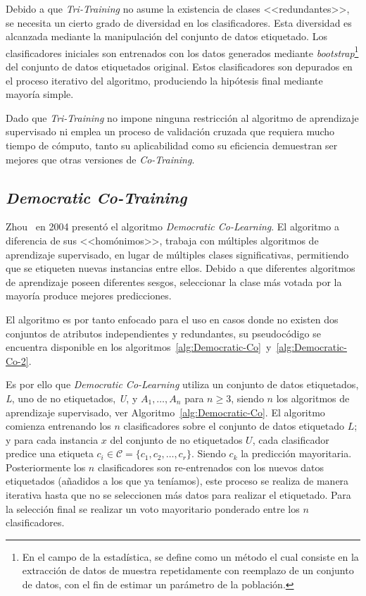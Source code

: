 Debido a que \textit{Tri-Training} no asume la existencia de clases <<redundantes>>, se necesita un cierto grado de diversidad en los clasificadores. Esta diversidad es alcanzada mediante la manipulación del conjunto de datos etiquetado. Los clasificadores iniciales son entrenados con los datos generados mediante \textit{bootstrap}\footnote{En el campo de la estadística, se define como un método el cual consiste en la extracción de datos de muestra repetidamente con reemplazo de un conjunto de datos, con el fin de estimar un parámetro de la población.} del conjunto de datos etiquetados original. Estos clasificadores son depurados en el proceso iterativo del algoritmo, produciendo la hipótesis final mediante mayoría simple.

Dado que \textit{Tri-Training} no impone ninguna restricción al algoritmo de aprendizaje supervisado ni emplea un proceso de validación cruzada que requiera mucho tiempo de cómputo, tanto su aplicabilidad como su eficiencia demuestran ser mejores que otras versiones de \textit{Co-Training}.

\subsection{\textit{Democratic Co-Training}}
Zhou~\cite{zhou2004democratic} en 2004 presentó el algoritmo \textit{Democratic Co-Learning}. El algoritmo a diferencia de sus <<homónimos>>, trabaja con múltiples algoritmos de aprendizaje supervisado, en lugar de múltiples clases significativas, permitiendo que se etiqueten nuevas instancias entre ellos. Debido a que diferentes algoritmos de aprendizaje poseen diferentes sesgos, seleccionar la clase más votada por la mayoría produce mejores predicciones.

El algoritmo es por tanto enfocado para el uso en casos donde no existen dos conjuntos de atributos independientes y redundantes, su pseudocódigo se encuentra disponible en los algoritmos~\ref{alg:Democratic-Co}~y~\ref{alg:Democratic-Co-2}.

Es por ello que \textit{Democratic Co-Learning} utiliza un conjunto de datos etiquetados, \textit{L}, uno de no etiquetados, \textit{U}, y $A_1,\dots ,A_n$ para $n \geq 3$, siendo $n$ los algoritmos de aprendizaje supervisado, ver Algoritmo~\ref{alg:Democratic-Co}. El algoritmo comienza entrenando los $n$ clasificadores sobre el conjunto de datos etiquetado $L$; y para cada instancia $x$ del conjunto de no etiquetados $U$, cada clasificador predice una etiqueta $c_i \in \mathcal{C} = \lbrace c_1, c_2, \dots , c_r\rbrace$. Siendo $c_k$ la predicción mayoritaria. Posteriormente los $n$ clasificadores son re-entrenados con los nuevos datos etiquetados (añadidos a los que ya teníamos), este proceso se realiza de manera iterativa hasta que no se seleccionen más datos para realizar el etiquetado. Para la selección final se realizar un voto mayoritario ponderado entre los $n$ clasificadores. 


